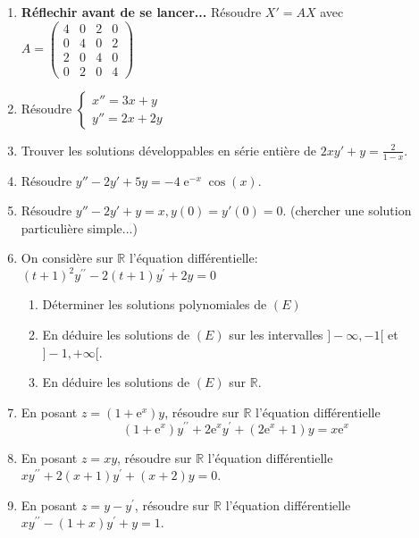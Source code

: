 \documentclass[12pt,a4paper]{article}
\DeclareMathOperator{\E}{\mathrm{e}}
\begin{document}
\begin{enumerate}

\item \textbf{Réflechir avant de se lancer...}
Résoudre $X'=AX$ avec $A=\begin{pmatrix}
	4 & 0 & 2 & 0 \\
	0 & 4 & 0 & 2 \\
	2 & 0 & 4 & 0 \\
	0 & 2 & 0 & 4
\end{pmatrix}$
\item Résoudre $\begin{cases}
x''=3x+y\\y''=2x+2y
\end{cases}$

\item
Trouver les solutions développables en série entière de $2xy'+y=\frac{2}{1-x}$.
\item Résoudre $y''-2y'+5y=-4\E^{-x}\cos(x)$.
\item Résoudre $y''-2y'+y=x,y(0)=y'(0)=0$. (chercher une solution particulière simple...)
\item
On considère sur $\mathbb{R}$ l'équation différentielle:
$
(t+1)^{2} y^{\prime \prime}-2(t+1) y^{\prime}+2 y=0
$
\begin{enumerate}
	

\item Déterminer les solutions polynomiales de $(E)$
\item En déduire les solutions de $(E)$ sur les intervalles $]-\infty,-1[$ et $]-1,+\infty[$.
\item En déduire les solutions de $(E)$ sur $\mathbb{R}$.
\end{enumerate}

\item En posant $z=\left(1+\mathrm{e}^{x}\right) y$, résoudre sur $\mathbb{R}$ l'équation différentielle
$$
\left(1+\mathrm{e}^{x}\right) y^{\prime \prime}+2 \mathrm{e}^{x} y^{\prime}+\left(2 \mathrm{e}^{x}+1\right) y=x \mathrm{e}^{x}
$$
\item En posant $z=x y$, résoudre sur $\mathbb{R}$ l'équation différentielle
$
x y^{\prime \prime}+2(x+1) y^{\prime}+(x+2) y=0
$.
\item  En posant $z=y-y^{\prime}$, résoudre sur $\mathbb{R}$ l'équation différentielle 
$
x y^{\prime \prime}-(1+x) y^{\prime}+y=1
$.


\end{enumerate}
\end{document}
